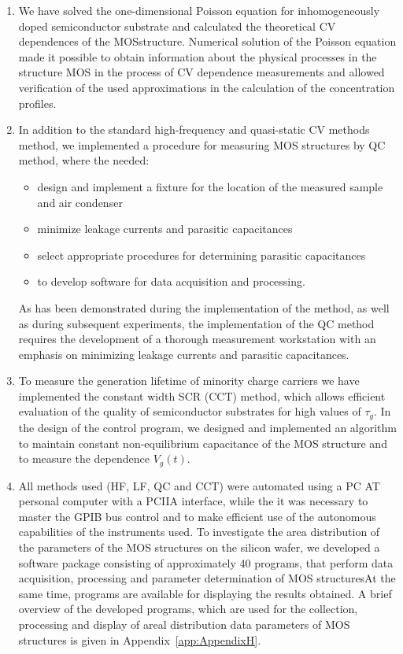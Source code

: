 \begin{enumerate}

\item We have solved the one-dimensional Poisson equation for
  inhomogeneously doped semiconductor substrate and calculated the
  theoretical CV dependences of the MOS\@ structure. Numerical
  solution of the Poisson equation made it possible to obtain
  information about the physical processes in the structure MOS in the
  process of CV dependence measurements and allowed verification of
  the used approximations in the calculation of the concentration
  profiles.

\item In addition to the standard high-frequency and quasi-static CV
  methods method, we implemented a procedure for measuring MOS
  structures by QC method, where the needed:

  \begin{itemize}
  \item design and implement a fixture for the location of the measured sample and
    air condenser
  \item minimize leakage currents and parasitic capacitances
  \item select appropriate procedures for determining parasitic capacitances
  \item to develop software for data acquisition and processing.
  \end{itemize}

  As has been demonstrated during the implementation of the method, as
  well as during subsequent experiments, the implementation of the QC
  method requires the development of a thorough measurement
  workstation with an emphasis on minimizing leakage currents and
  parasitic capacitances.

\item To measure the generation lifetime of minority charge carriers
  we have implemented the constant width SCR (CCT) method, which
  allows efficient evaluation of the quality of semiconductor
  substrates for high values of $\tau_{g}$. In the design of the
  control program, we designed and implemented an algorithm to
  maintain constant non-equilibrium capacitance of the MOS structure
  and to measure the dependence $V_{g}(t)$.

\item All methods used (HF, LF, QC and CCT) were automated using a PC
  AT personal computer with a PCIIA interface, while the it was
  necessary to master the GPIB bus control and to make efficient use
  of the autonomous capabilities of the instruments used. To
  investigate the area distribution of the parameters of the MOS
  structures on the silicon wafer, we developed a software package
  consisting of approximately 40 programs, that perform data
  acquisition, processing and parameter determination of MOS
  structures\@ At the same time, programs are available for displaying
  the results obtained. A brief overview of the developed programs,
  which are used for the collection, processing and display of areal
  distribution data parameters of MOS structures is given in
  Appendix~\ref{app:AppendixH}.


\end{enumerate}
